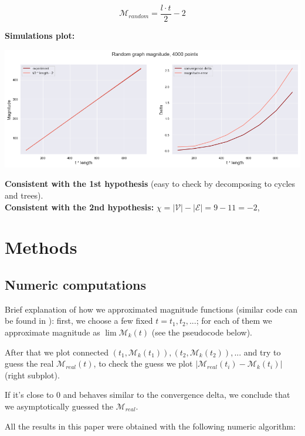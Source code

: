 \documentclass{article}
\begin{document}
$$\mathcal{M}_{random} = \frac{l \cdot t}{2} - 2$$

\textbf{Simulations plot:} 

\begin{center}
\includegraphics[width=\textwidth]{random_plot}
\end{center}

\textbf{Consistent with the 1st hypothesis} (easy to check by decomposing to cycles and trees). \\

\textbf{Consistent with the 2nd hypothesis:} $\chi = |\mathcal{V}| - |\mathcal{E}| = 9 - 11 = -2$, 

\section{Methods}

\subsection{Numeric computations}

Brief explanation of how we approximated magnitude functions (similar code can be found in \textcite{calc}):
first, we choose a few fixed $t = {t_1, t_2, ...}$; for each of them we approximate magnitude as 
$\lim \mathcal{M}_k(t)$ (see the pseudocode below). 

After that we plot connected ${(t_1, \mathcal{M}_k(t_1)), (t_2, \mathcal{M}_k(t_2)), ...}$
and try to guess the real $\mathcal{M}_{real}(t)$, to check the guess we plot
$|\mathcal{M}_{real}(t_i) - \mathcal{M}_k(t_i)|$ (right subplot). 

If it's close to 0 and behaves similar to the convergence delta, we conclude that we
asymptotically guessed the $\mathcal{M}_{real}$.  

All the results in this paper were obtained with the following numeric algorithm:\\
\end{document}
